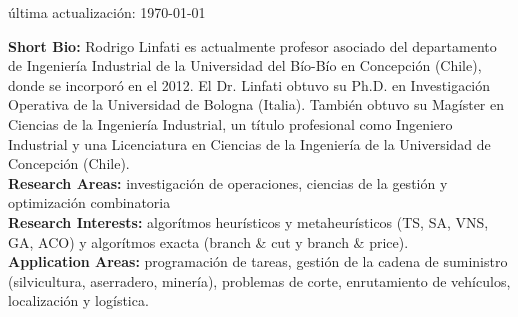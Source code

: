 \makecvtitle
\'ultima actualizaci\'on: \today

\textbf{Short Bio:} Rodrigo Linfati es actualmente profesor asociado del departamento de Ingenier\'ia Industrial de la Universidad del B\'io-B\'io en Concepci\'on (Chile), donde se incorpor\'o en el 2012. El Dr. Linfati obtuvo su Ph.D. en Investigaci\'on Operativa de la Universidad de Bologna (Italia). Tambi\'en obtuvo su Mag\'ister en Ciencias de la Ingenier\'ia Industrial, un t\'itulo profesional como Ingeniero Industrial y una Licenciatura en Ciencias de la Ingenier\'ia de la Universidad de Concepci\'on (Chile).
~ \\
\textbf{Research Areas:} investigaci\'on de operaciones, ciencias de la gesti\'on y optimizaci\'on combinatoria
~ \\
\textbf{Research Interests:} algor\'itmos heur\'isticos y metaheur\'isticos (TS, SA, VNS, GA, ACO) y algor\'itmos exacta (branch \& cut y branch \& price).
~ \\
\textbf{Application Areas:} programaci\'on de tareas, gesti\'on de la cadena de suministro (silvicultura, aserradero, miner\'ia), problemas de corte, enrutamiento de veh\'iculos, localizaci\'on y log\'istica.

\clearpage